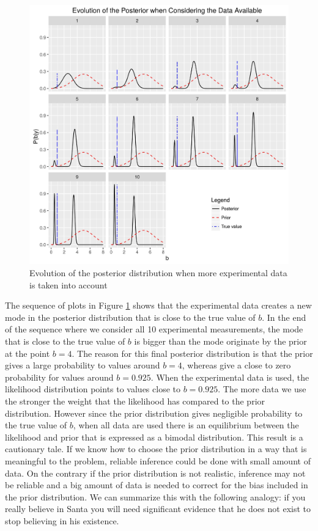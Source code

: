 \documentclass[12pt]{book}
\begin{document}
\begin{figure}[H]
\centering
\includegraphics[scale=0.7]{./FigChap3/posterior_evolution}
\caption{Evolution of the posterior distribution when more experimental data is taken into account}
\label{figpostevolution}
\end{figure}

The sequence of plots in Figure \ref{figpostevolution} shows that the experimental data creates a new mode
in the posterior distribution that is close to the true value of $b$. In the end of the sequence where we consider
all 10 experimental measurements, the mode that is close to the true value of $b$ is bigger than the mode originate
by the prior at the point $b=4$. The reason for this final posterior distribution is that the prior gives a large
probability to values around $b=4$, whereas give a close to zero probability for values around $b=0.925$.
When the experimental data is used, the likelihood distribution points to values close to $b=0.925$. The more data
we use the stronger the weight that the likelihood has compared to the prior distribution. However since
the prior distribution gives negligible probability to the true value of $b$, when all data are used there
is an equilibrium between the likelihood and prior that is expressed as a bimodal distribution. This result
is a cautionary tale. If we know how to choose the prior distribution in a way that is meaningful to the
problem, reliable inference could be done with small amount of data. On the contrary if the prior distribution
is not realistic, inference may not be reliable and a big amount of data is needed
to correct for the bias included in the prior distribution. We can summarize this with the following analogy: if you really believe
in Santa you will need significant  evidence that he does not exist to stop believing in his existence.







\end{document}
